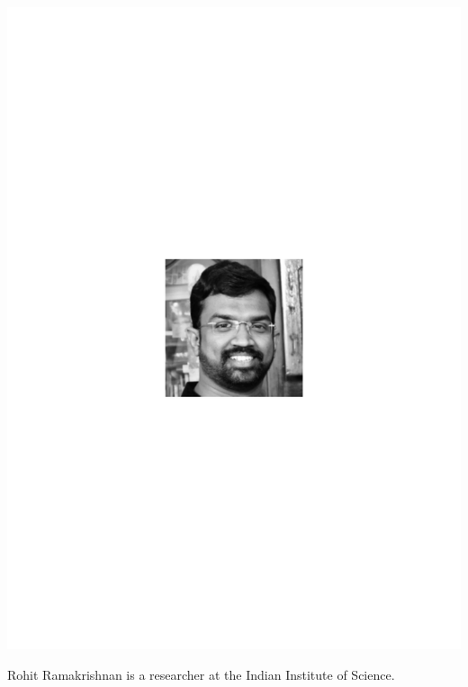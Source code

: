 \documentclass[aps,prl,twocolumn,amsmath,amssymb,nofootinbib,superscriptaddress]{revtex4}
\begin{document}
\includegraphics[width=\columnwidth]{photo_rohit_ramakrishnan}

Rohit Ramakrishnan is a researcher at the Indian Institute of Science.
\end{document}
